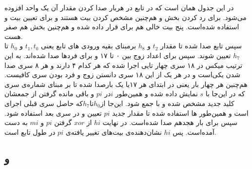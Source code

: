 در این جدول  همان  است که در تابع\hyperref[subsec:skein-big-core]{} در هربار صدا کردن  مقدار آن یک واحد افزوده می‌شود.  برای رد کردن بخش  و هم‌چنین مشخص کردن بیت  هستند و  برای تعیین بیت  و  استفاده شده‌است. پنج بیت خالی هم برای قرار داده شده و هم‌چنین بخش  هم صفر هست. 
\\
سپس تابع\hyperref[subsec:TFBIG-KINIT]{}
صدا شده تا مقدار $ t_2 $ و $ h_8 $ برمبنای بقیه ورودی های تابع یعنی $ t_1 , t_0 $ و $ h_0 $ تا $ h_7 $ تعیین شوند. سپس برای اعداد زوج بین ۰ تا ۱۷\hyperref[subsec:TFBIG-4e]{} و برای فردها \hyperref[subsec:TFBIG-4o]{} صدا شده‌اند. به این ترتیب میکس در ۱۸ سری چهار تایی اجرا شده که هر کدام ۴  دارند و هر ۸ سری صدا شدن یکی‌است و در هر یک از این ۱۸ سری دانستن زوج و فرد بودن سری کافیست. هم‌چنین هر چهار بار یعنی در ابتدای هر ۱۷یا یک بار\hyperref[subsec:TFBIG-ADDKEY]{}صدا شده تا بر مبنای شماره‌ی سری که در این‌جا با $ s$ نمایش داده شده و همین‌طور $ i $در $ pi $ و باقی مانده گرفتن از جمعشان کلید جدید مشخص شده و با  جمع شود. این‌جا از$ h_0 $تا$ h_7 $که حاصل سری قبلی اجرای است و همین‌طور  ها استفاده شده تا مقدار جدید $ pi $ تعیین و در سری بعد استفاده شود. سپس برای بار هجدهم  صدا شده‌است. در نهایت $ hi $ از $ xor $ گرفتن $pi $ و $ mi $ به دست ‌آمده‌است. پس ‌‌‌$ hi $ نشان‌دهنده‌ی بیت‌های تغییر یافته‌ی ‌$ pi $ در طول تابع است.


\subsection{و }
\label{subsec:TFBIG-4e}
\label{subsec:TFBIG-4o}

